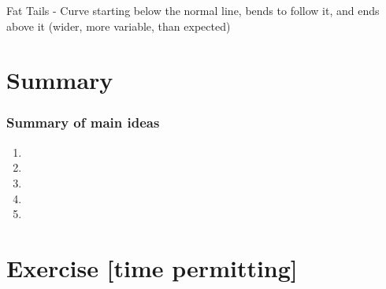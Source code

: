 \documentclass[11pt,containsverbatim,handout,xcolor=xelatex,dvipsnames,table]{beamer}
\begin{document}
\begin{frame}
\pause
{}
{
Fat Tails - Curve starting below the normal line, bends to follow it, and ends above it (wider, more variable, than expected)
}

\end{frame}


\section{Summary}


\begin{frame}
\frametitle{Summary of main ideas}

\vfill

\begin{enumerate}

\item {}

\item {}

\item {}

\item {}

\item {}

\end{enumerate}

\vfill

\end{frame}


\section{Exercise [time permitting]}
\end{document}
